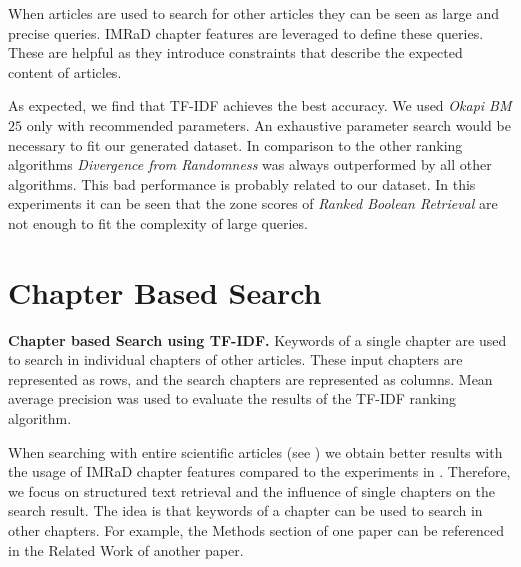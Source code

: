 When articles are used to search for other articles they can be seen as large and precise queries. IMRaD chapter features are leveraged to define these queries. These are helpful as they introduce constraints that describe the expected content of articles.

As expected, we find that TF-IDF achieves the best accuracy. We used \textit{Okapi BM$25$} only with recommended parameters. An exhaustive parameter search would be necessary to fit our generated dataset. In comparison to the other ranking algorithms \textit{Divergence from Randomness} was always outperformed by all other algorithms. This bad performance is probably related to our dataset. In this experiments it can be seen that the zone scores of \textit{Ranked Boolean Retrieval} are not enough to fit the complexity of large queries. 


\section{Chapter Based Search}

\begin{table}[b!]
\vrule{}\vrule
  \caption[Chapter based Search using TF-IDF]{\textbf{Chapter based Search using TF-IDF.} Keywords of a single chapter are used to search in individual chapters of other articles. These input chapters are represented as rows, and the search chapters are represented as columns. Mean average precision was used to evaluate the results of the TF-IDF ranking algorithm.}
  \label{tbl:chapter_based_tfidf}
\end{table}

When searching with entire scientific articles (see ) we obtain better results with the usage of IMRaD chapter features compared to the experiments in . Therefore, we focus on structured text retrieval and the influence of single chapters on the search result. The idea is that keywords of a chapter can be used to search in other chapters. For example, the Methods section of one paper can be referenced in the Related Work of another paper.

